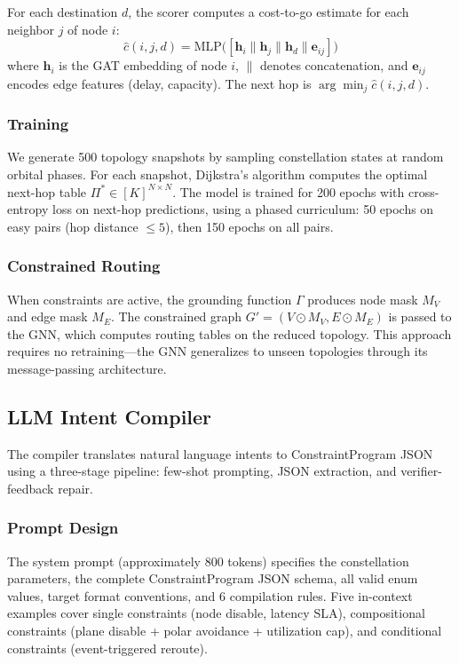 \documentclass[10pt, conference, letterpaper]{IEEEtran}
\begin{document}
For each destination $d$, the scorer computes a cost-to-go estimate
for each neighbor $j$ of node $i$:
\begin{equation}
\hat{c}(i, j, d) = \text{MLP}\big([\mathbf{h}_i \| \mathbf{h}_j \|
\mathbf{h}_d \| \mathbf{e}_{ij}]\big)
\end{equation}
where $\mathbf{h}_i$ is the GAT embedding of node $i$, $\|$ denotes
concatenation, and $\mathbf{e}_{ij}$ encodes edge features (delay,
capacity). The next hop is $\arg\min_j \hat{c}(i, j, d)$.

\subsubsection{Training}
We generate 500 topology snapshots by sampling constellation states
at random orbital phases. For each snapshot, Dijkstra's algorithm
computes the optimal next-hop table $\Pi^* \in [K]^{N \times N}$.
The model is trained for 200 epochs with cross-entropy loss on
next-hop predictions, using a phased curriculum: 50 epochs on
easy pairs (hop distance $\leq 5$), then 150 epochs on all pairs.

\subsubsection{Constrained Routing}
When constraints are active, the grounding function $\Gamma$ produces
node mask $M_V$ and edge mask $M_E$. The constrained graph
$G' = (V \odot M_V, E \odot M_E)$ is passed to the GNN, which
computes routing tables on the reduced topology. This approach
requires no retraining---the GNN generalizes to unseen topologies
through its message-passing architecture.

\subsection{LLM Intent Compiler}
\label{sec:compiler}

The compiler translates natural language intents to ConstraintProgram
JSON using a three-stage pipeline: few-shot prompting, JSON extraction,
and verifier-feedback repair.

\subsubsection{Prompt Design}
The system prompt (approximately 800 tokens) specifies the constellation
parameters, the complete ConstraintProgram JSON schema, all valid enum
values, target format conventions, and 6 compilation rules. Five
in-context examples cover single constraints (node disable, latency
SLA), compositional constraints (plane disable + polar avoidance +
utilization cap), and conditional constraints (event-triggered reroute).
\end{document}
